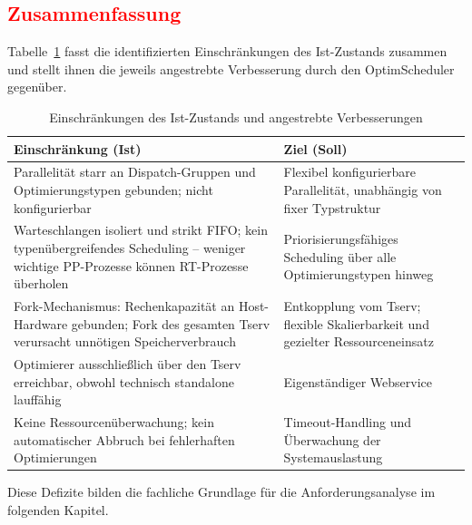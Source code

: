 \newpage
\subsection{\textcolor{red}{Zusammenfassung}}

Tabelle~\ref{tab:istprobleme} fasst die identifizierten Einschränkungen des Ist-Zustands zusammen und stellt ihnen die jeweils angestrebte Verbesserung durch den OptimScheduler gegenüber.

\begin{table}[H]
    \centering
    {\setlength{\arrayrulewidth}{0.3pt}
    \begin{tabular}{p{} p{}}
        \hline
        \textbf{Einschränkung (Ist)} & \textbf{Ziel (Soll)} \\
        \hline
        Parallelität starr an Dispatch-Gruppen und Optimierungstypen gebunden; nicht konfigurierbar & Flexibel konfigurierbare Parallelität, unabhängig von fixer Typstruktur \\
        \hline
        Warteschlangen isoliert und strikt FIFO; kein typenübergreifendes Scheduling -- weniger wichtige PP-Prozesse können RT-Prozesse überholen & Priorisierungsfähiges Scheduling über alle Optimierungstypen hinweg \\
        \hline
        Fork-Mechanismus: Rechenkapazität an Host-Hardware gebunden; Fork des gesamten Tserv verursacht unnötigen Speicherverbrauch & Entkopplung vom Tserv; flexible Skalierbarkeit und gezielter Ressourceneinsatz \\
        \hline
        Optimierer ausschließlich über den Tserv erreichbar, obwohl technisch standalone lauffähig & Eigenständiger Webservice \\
        \hline
        Keine Ressourcenüberwachung; kein automatischer Abbruch bei fehlerhaften Optimierungen & Timeout-Handling und Überwachung der Systemauslastung \\
        \hline
    \end{tabular}}
    \caption{Einschränkungen des Ist-Zustands und angestrebte Verbesserungen}
    \label{tab:istprobleme}
\end{table}

Diese Defizite bilden die fachliche Grundlage für die Anforderungsanalyse im folgenden Kapitel.